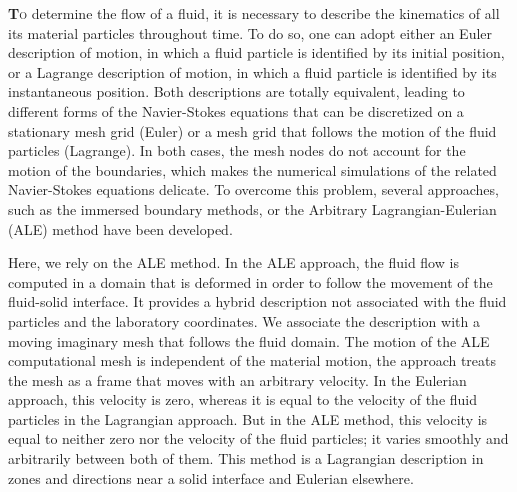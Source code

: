 \lettrine[lines=2,slope=0pt,nindent=4pt]{\textbf{T}}{o} determine the flow of a fluid, it is necessary to describe the kinematics of all its
material particles throughout time. To do so, one can adopt either an Euler description
of motion, in which a fluid particle is identified by its initial position, or a Lagrange
description of motion, in which a fluid particle is identified by its instantaneous position.
Both descriptions are totally equivalent, leading to different forms of the Navier-Stokes
equations that can be discretized on a stationary mesh grid (Euler) or a mesh grid that
follows the motion of the fluid particles (Lagrange). In both cases, the mesh nodes do not
account for the motion of the boundaries, which makes the numerical simulations of the
related Navier-Stokes equations delicate. To overcome this problem, several approaches,
such as the immersed boundary methods, or the Arbitrary Lagrangian-Eulerian
(ALE) method have been developed.\smallskip\newline

Here, we rely on the ALE method. In the ALE approach, the fluid flow is computed in
a domain that is deformed in order to follow the movement of the fluid-solid interface. It
provides a hybrid description not associated with the fluid particles and the laboratory
coordinates. We associate the description with a moving imaginary mesh that follows the
fluid domain. The motion of the ALE computational mesh is independent of the material
motion, the approach treats the mesh as a frame that moves with an arbitrary velocity.
In the Eulerian approach, this velocity is zero, whereas it is equal to the velocity
of the fluid particles in the Lagrangian approach. But in the ALE method, this velocity
is equal to neither zero nor the velocity of the fluid particles; it varies smoothly and
arbitrarily between both of them. This method is a Lagrangian description in zones and
directions near a solid interface and Eulerian elsewhere.\smallskip\newline

